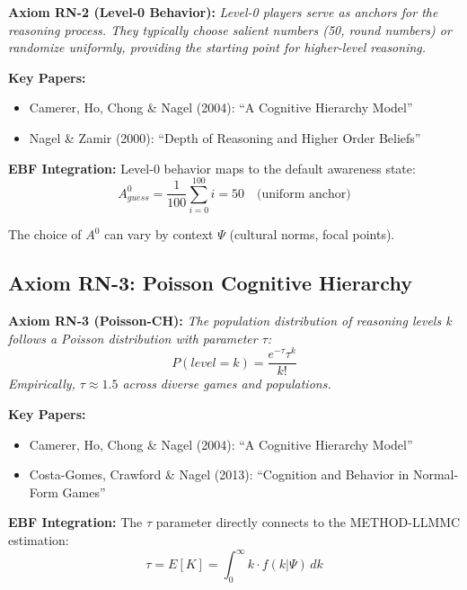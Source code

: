 \begin{tcolorbox}[colback=blue!5!white, colframe=blue!75!black]
\textbf{Axiom RN-2 (Level-0 Behavior):}
\textit{Level-0 players serve as anchors for the reasoning process. They typically choose salient numbers (50, round numbers) or randomize uniformly, providing the starting point for higher-level reasoning.}
\end{tcolorbox}

\textbf{Key Papers:}
\begin{itemize}[nosep]
    \item Camerer, Ho, Chong \& Nagel (2004): ``A Cognitive Hierarchy Model''
    \item Nagel \& Zamir (2000): ``Depth of Reasoning and Higher Order Beliefs''
\end{itemize}

\textbf{EBF Integration:}
Level-0 behavior maps to the default awareness state:
\begin{equation}
A^0_{guess} = \frac{1}{100}\sum_{i=0}^{100} i = 50 \quad \text{(uniform anchor)}
\end{equation}

The choice of $A^0$ can vary by context $\Psi$ (cultural norms, focal points).

\subsection{Axiom RN-3: Poisson Cognitive Hierarchy}

\begin{tcolorbox}[colback=blue!5!white, colframe=blue!75!black]
\textbf{Axiom RN-3 (Poisson-CH):}
\textit{The population distribution of reasoning levels k follows a Poisson distribution with parameter $\tau$:}
\begin{equation}
P(level = k) = \frac{e^{-\tau} \tau^k}{k!}
\end{equation}
\textit{Empirically, $\tau \approx 1.5$ across diverse games and populations.}
\end{tcolorbox}

\textbf{Key Papers:}
\begin{itemize}[nosep]
    \item Camerer, Ho, Chong \& Nagel (2004): ``A Cognitive Hierarchy Model''
    \item Costa-Gomes, Crawford \& Nagel (2013): ``Cognition and Behavior in Normal-Form Games''
\end{itemize}

\textbf{EBF Integration:}
The $\tau$ parameter directly connects to the METHOD-LLMMC estimation:
\begin{equation}
\tau = E[K] = \int_0^\infty k \cdot f(k|\Psi) \, dk
\end{equation}

